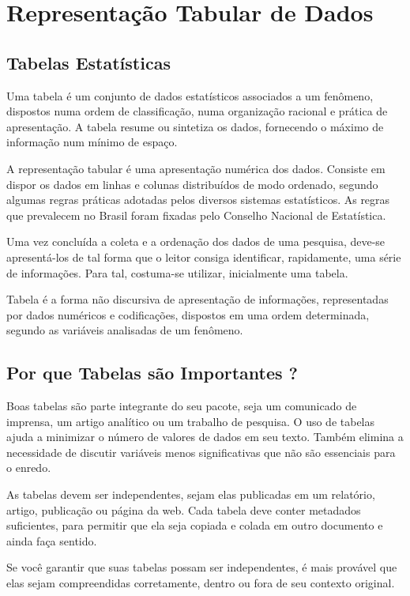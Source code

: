 \chapter{Representação Tabular de Dados}
\section{Tabelas Estatísticas}

\inic Uma tabela é um conjunto de dados estatísticos associados a um fenômeno, dispostos numa ordem de classificação, numa organização racional e prática de apresentação. A tabela resume ou sintetiza os dados, fornecendo o máximo de informação num mínimo de espaço.\vskip0.3cm

\inic A representação tabular é uma apresentação numérica dos dados. Consiste em dispor os dados em linhas e colunas distribuídos de modo ordenado, segundo algumas regras práticas adotadas pelos diversos sistemas estatísticos. As regras que prevalecem no Brasil foram fixadas pelo Conselho Nacional de Estatística.\vskip0.3cm

\inic Uma vez concluída a coleta e a ordenação dos dados de uma pesquisa, deve-se apresentá-los de tal forma que o leitor consiga identificar, rapidamente, uma série de informações. Para tal, costuma-se utilizar, inicialmente uma tabela.\vskip0.3cm


\inic Tabela é a forma não discursiva de apresentação de informações, representadas por dados numéricos e codificações, dispostos em uma ordem determinada, segundo as variáveis analisadas de um fenômeno.

\section{Por que Tabelas são Importantes ?}

\inic Boas tabelas são parte integrante do seu pacote, seja um comunicado de imprensa, um artigo analítico ou um trabalho de pesquisa. O uso de tabelas ajuda a minimizar o número de valores de dados em seu texto. Também elimina a necessidade de discutir variáveis ​​menos significativas que não são essenciais para o enredo.\vskip0.3cm

As tabelas devem ser independentes, sejam elas publicadas em um relatório, artigo, publicação ou página da web. Cada tabela deve conter metadados suficientes, para permitir que ela seja copiada e colada em outro documento e ainda faça sentido.\vskip0.3cm

Se você garantir que suas tabelas possam ser independentes, é mais provável que elas sejam compreendidas corretamente, dentro ou fora de seu contexto original.\vst

